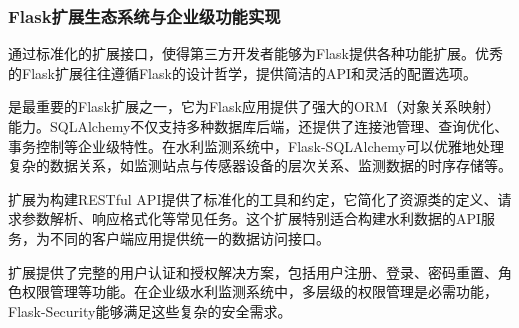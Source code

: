 \hypertarget{flaskux6269ux5c55ux751fux6001ux7cfbux7edfux4e0eux4f01ux4e1aux7ea7ux529fux80fdux5b9eux73b0}{%
\subsubsection{Flask扩展生态系统与企业级功能实现}\label{flaskux6269ux5c55ux751fux6001ux7cfbux7edfux4e0eux4f01ux4e1aux7ea7ux529fux80fdux5b9eux73b0}}

通过标准化的扩展接口，使得第三方开发者能够为Flask提供各种功能扩展。优秀的Flask扩展往往遵循Flask的设计哲学，提供简洁的API和灵活的配置选项。

是最重要的Flask扩展之一，它为Flask应用提供了强大的ORM（对象关系映射）能力。SQLAlchemy不仅支持多种数据库后端，还提供了连接池管理、查询优化、事务控制等企业级特性。在水利监测系统中，Flask-SQLAlchemy可以优雅地处理复杂的数据关系，如监测站点与传感器设备的层次关系、监测数据的时序存储等。

扩展为构建RESTful API提供了标准化的工具和约定，它简化了资源类的定义、请求参数解析、响应格式化等常见任务。这个扩展特别适合构建水利数据的API服务，为不同的客户端应用提供统一的数据访问接口。

扩展提供了完整的用户认证和授权解决方案，包括用户注册、登录、密码重置、角色权限管理等功能。在企业级水利监测系统中，多层级的权限管理是必需功能，Flask-Security能够满足这些复杂的安全需求。

